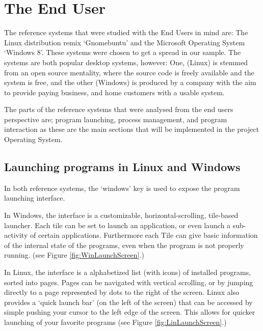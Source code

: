 \documentclass[a4paper]{report}
\begin{document}
\section{The End User}
The reference systems that were studied with the End Users in mind are: The Linux distribution remix `Gnomebuntu' and the Microsoft Operating System `Windows 8'. These systems were chosen to get a spread in our sample. The systems are both popular desktop systems, however: One, (Linux) is stemmed from an open source mentality, where the source code is freely available and the system is free, and the other (Windows) is produced by a company with the aim to provide paying business, and home customers with a usable system.

The parts of the reference systems that were analysed from the end users perspective are; program launching, process management, and program interaction as these are the main sections that will be implemented in the project Operating System.

\subsection{Launching programs in Linux and Windows}

In both reference systems, the `windows' key is used to expose the program launching interface.

In Windows, the interface is a customizable, horizontal-scrolling, tile-based launcher. Each tile can be set to launch an application, or even launch a sub-activity of certain applications. Furthermore each Tile can give basic information of the internal state of the programs, even when the program is not properly running. (see Figure \ref{fig:WinLaunchScreen}.)


In Linux, the interface is a alphabetized list (with icons) of installed programs, sorted into pages. Pages can be navigated with vertical scrolling, or by jumping directly to a page represented by dots to the right of the screen. Linux also provides a `quick launch bar' (on the left of the screen) that can be accessed by simple pushing your cursor to the left edge of the screen. This allows for quicker launching of your favorite programs (see Figure \ref{fig:LinLaunchScreen}.)
\end{document}
